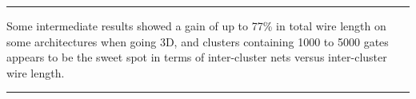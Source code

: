 \documentclass[11pt,a4paper]{report} %
\theoremstyle{customdef}
\renewenvironment{abstract}{%
\begin{center}\begin{minipage}{0.85\textwidth}
\rule{\textwidth}{1pt}}
{\par\noindent\rule{\textwidth}{1pt}\end{minipage}\end{center}}
\begin{document}
\begin{titlepage}
\begin{center}
\begin{abstract}
Some intermediate results showed a gain of up to 77\% in total wire length on some architectures when going 3D, and clusters containing 1000 to 5000 gates appears to be the sweet spot in terms of inter-cluster nets versus inter-cluster wire length.




\end{abstract}
 \vfill
\end{center}
\end{titlepage}







\clearpage


\pagestyle{fancy}
\fancyhf{}
\end{document}
